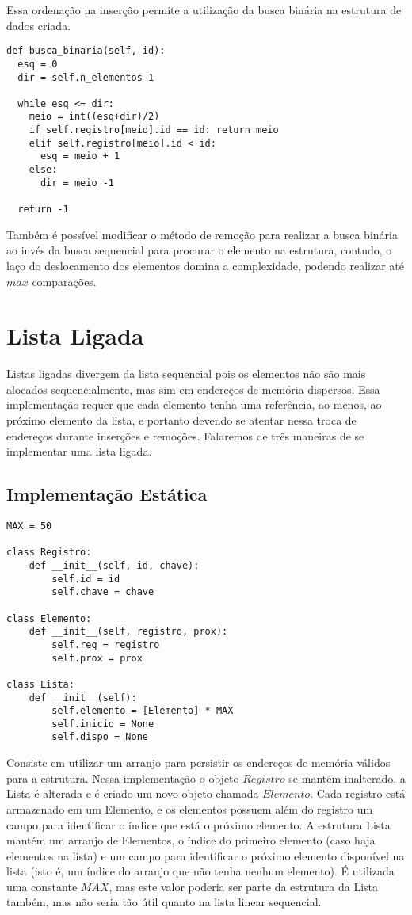 \documentclass[a4paper, twocolumn]{article}
\theoremstyle{definition}
\begin{document}
Essa ordenação na inserção permite a utilização da busca binária na estrutura de dados criada.

\begin{lstlisting}[label=lista_linear_busca_bin,caption= Lista linear sequencial ordenada (busca binária)]
def busca_binaria(self, id):
  esq = 0
  dir = self.n_elementos-1
     
  while esq <= dir:
    meio = int((esq+dir)/2)
    if self.registro[meio].id == id: return meio 
    elif self.registro[meio].id < id: 
      esq = meio + 1
    else:
      dir = meio -1
  
  return -1 
\end{lstlisting}

Também é possível modificar o método de remoção para realizar a busca binária ao invés da busca sequencial para procurar o elemento na estrutura, contudo, o laço do deslocamento dos elementos domina a complexidade, podendo realizar até $max$ comparações.

\section{Lista Ligada}
Listas ligadas divergem da lista sequencial pois os elementos não são mais alocados sequencialmente, mas sim em endereços de memória dispersos. Essa implementação requer que cada elemento tenha uma referência, ao menos, ao próximo elemento da lista, e portanto devendo se atentar nessa troca de endereços durante inserções e remoções. Falaremos de três maneiras de se implementar uma lista ligada.

\subsection{Implementação Estática}
\begin{lstlisting}[label=lista_ligada_estat_estrutura,caption= Lista Ligada estática ordenada (estrutura)]
MAX = 50

class Registro:
    def __init__(self, id, chave):
        self.id = id
        self.chave = chave

class Elemento:
    def __init__(self, registro, prox):
        self.reg = registro
        self.prox = prox

class Lista:
    def __init__(self):
        self.elemento = [Elemento] * MAX
        self.inicio = None
        self.dispo = None
\end{lstlisting}


Consiste em utilizar um arranjo para persistir os endereços de memória válidos para a estrutura. Nessa implementação o objeto $Registro$ se mantém inalterado, a Lista é alterada e é criado um novo objeto chamada $Elemento$. Cada registro está armazenado em um Elemento, e os elementos possuem além do registro um campo para identificar o índice que está o próximo elemento. A estrutura Lista mantém um arranjo de Elementos, o índice do primeiro elemento (caso haja elementos na lista) e um campo para identificar o próximo elemento disponível na lista (isto é, um índice do arranjo que não tenha nenhum elemento). É utilizada uma constante $MAX$, mas este valor poderia ser parte da estrutura da Lista também, mas não seria tão útil quanto na lista linear sequencial.
\end{document}
